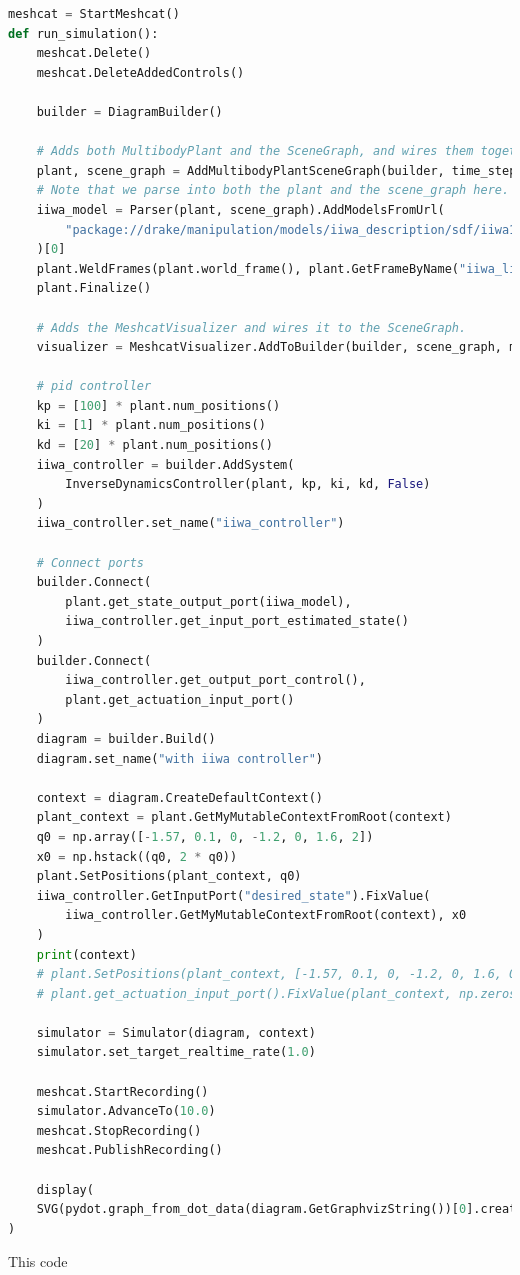 \documentclass[11pt, titlepage]{article}
\begin{document}
\begin{lstlisting}[language=Python]
meshcat = StartMeshcat()
def run_simulation():
    meshcat.Delete()
    meshcat.DeleteAddedControls()
    
    builder = DiagramBuilder()

    # Adds both MultibodyPlant and the SceneGraph, and wires them together.
    plant, scene_graph = AddMultibodyPlantSceneGraph(builder, time_step=1e-4)
    # Note that we parse into both the plant and the scene_graph here.
    iiwa_model = Parser(plant, scene_graph).AddModelsFromUrl(
        "package://drake/manipulation/models/iiwa_description/sdf/iiwa14_no_collision.sdf"
    )[0]
    plant.WeldFrames(plant.world_frame(), plant.GetFrameByName("iiwa_link_0"))
    plant.Finalize()

    # Adds the MeshcatVisualizer and wires it to the SceneGraph.
    visualizer = MeshcatVisualizer.AddToBuilder(builder, scene_graph, meshcat)

    # pid controller
    kp = [100] * plant.num_positions()
    ki = [1] * plant.num_positions()
    kd = [20] * plant.num_positions()
    iiwa_controller = builder.AddSystem(
        InverseDynamicsController(plant, kp, ki, kd, False)
    )
    iiwa_controller.set_name("iiwa_controller")

    # Connect ports
    builder.Connect(
        plant.get_state_output_port(iiwa_model),
        iiwa_controller.get_input_port_estimated_state()
    )
    builder.Connect(
        iiwa_controller.get_output_port_control(),
        plant.get_actuation_input_port()
    )
    diagram = builder.Build()
    diagram.set_name("with iiwa controller")

    context = diagram.CreateDefaultContext()
    plant_context = plant.GetMyMutableContextFromRoot(context)
    q0 = np.array([-1.57, 0.1, 0, -1.2, 0, 1.6, 2])
    x0 = np.hstack((q0, 2 * q0))
    plant.SetPositions(plant_context, q0)
    iiwa_controller.GetInputPort("desired_state").FixValue(
        iiwa_controller.GetMyMutableContextFromRoot(context), x0
    )
    print(context)
    # plant.SetPositions(plant_context, [-1.57, 0.1, 0, -1.2, 0, 1.6, 0])
    # plant.get_actuation_input_port().FixValue(plant_context, np.zeros(7))

    simulator = Simulator(diagram, context)
    simulator.set_target_realtime_rate(1.0)

    meshcat.StartRecording()
    simulator.AdvanceTo(10.0)
    meshcat.StopRecording()
    meshcat.PublishRecording()

    display(
    SVG(pydot.graph_from_dot_data(diagram.GetGraphvizString())[0].create_svg())
)

\end{lstlisting}
This code
\end{document}
